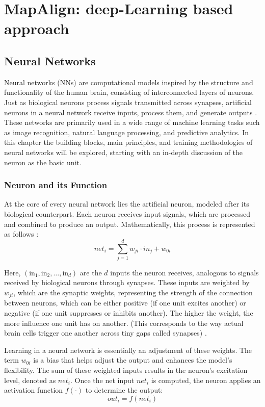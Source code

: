 \NoBgThispage
\chapter{MapAlign: deep-Learning based approach}

\section{Neural Networks}
Neural networks (NNs) are computational models inspired by the structure and functionality of the human brain, consisting of interconnected layers of neurons. Just as biological neurons process signals transmitted across synapses, artificial neurons in a neural network receive inputs, process them, and generate outputs \cite{Grosan2011}. These networks are primarily used in a wide range of machine learning tasks such as image recognition, natural language processing, and predictive analytics.
In this chapter the building blocks, main principles, and training methodologies of neural networks will be explored, starting with an in-depth discussion of the neuron as the basic unit.

\subsection{Neuron and its Function}
At the core of every neural network lies the artificial neuron, modeled after its biological counterpart. Each neuron receives input signals, which are processed and combined to produce an output. Mathematically, this process is represented as follows \cite{10.11648/j.ajnna.20190501.12}:
\begin{equation}
    \textit{net}_i = \sum_{j=1}^{d} w_{ji} \cdot \textit{in}_j + w_{0i}
\end{equation}


Here, $(\text{in}_1, \text{in}_2, \ldots, \text{in}_d)$ are the $d$ inputs the neuron receives, analogous to signals received by biological neurons through synapses. These inputs are weighted by $w_{ji}$, which are the synaptic weights, representing the strength of the connection between neurons, which can be either positive (if one unit excites another) or negative (if one unit suppresses or inhibits another). The higher the weight, the more influence one unit has on another. (This corresponds to the way actual brain cells trigger one another across tiny gaps called synapses) \cite{10.11648/j.ajnna.20190501.12}.

Learning in a neural network is essentially an adjustment of these weights. The term $w_{0i}$ is a bias that helps adjust the output and enhances the model's flexibility. The sum of these weighted inputs results in the neuron’s excitation level, denoted as $\textit{net}_i$.
Once the net input ${net}_i$ is computed, the neuron applies an activation function $f(\cdot)$ to determine the output:
\begin{equation}
    \textit{out}_i = f(\textit{net}_i)
\end{equation}

